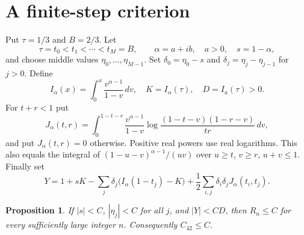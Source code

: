 \documentclass[11pt]{amsart}
\newtheorem{proposition}[theorem]{Proposition}
\begin{document}
\section{A finite-step criterion}
Put $\tau=1/3$ and $B=2/3$. Let
\[
 \tau=t_0<t_1<\cdots<t_M=B,\qquad
 \alpha=a+ib,\quad a>0,\quad s=1-\alpha,
\]
and choose middle values $\eta_0,\ldots,\eta_{M-1}$.
Set $\delta_0=\eta_0-s$ and
$\delta_j=\eta_j-\eta_{j-1}$ for $j>0$. Define
\[
 I_\alpha(x)=\int_0^x\frac{v^{\alpha-1}}{1-v}\,dv,
 \quad K=I_\alpha(\tau),\quad D=I_a(\tau)>0.
\]
For $t+r<1$ put
\[
 J_\alpha(t,r)=\int_0^{1-t-r}\frac{v^{\alpha-1}}{1-v}
       \log\frac{(1-t-v)(1-r-v)}{tr}\,dv,
\]
and put $J_\alpha(t,r)=0$ otherwise. Positive real powers use real
logarithms. This also equals the integral of
$(1-u-v)^{\alpha-1}/(uv)$ over $u\ge t$, $v\ge r$, $u+v\le1$.
Finally set
\begin{equation}\label{eq:Y}
 Y=1+sK-\sum_j\delta_j\bigl(I_\alpha(1-t_j)-K\bigr)
       +\frac12\sum_{i,j}\delta_i\delta_jJ_\alpha(t_i,t_j).
\end{equation}

\begin{proposition}\label{prop:criterion}
If $|s|<C$, $|\eta_j|<C$ for all $j$, and $|Y|<CD$, then
$R_n\le C$ for every sufficiently large integer $n$. Consequently
$C_{42}\le C$.
\end{proposition}
\end{document}

